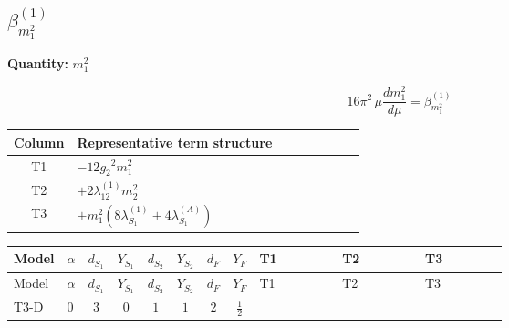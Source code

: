 \documentclass[8pt]{article}
\begin{document}
\begin{landscape}
\section*{$\beta_{m_1^2}^{(1)}$}
\noindent\textbf{Quantity: }$m_1^2$\par\smallskip
\[16\pi^2\,\mu\frac{d m_1^2}{d\mu}=\beta_{m_1^2}^{(1)}\]
\begin{center}
\begin{tabular}{@{}c >{\raggedright\arraybackslash}p{0.82\linewidth}@{}}
\toprule
Column & Representative term structure \\
\midrule
T1 & \(\displaystyle -12 {g_2}^2 {m_1^2}\) \\
\midrule
T2 & \(\displaystyle +2 {\lambda_{12}^{(1)}} {m_2^2}\) \\
\midrule
T3 & \(\displaystyle +{m_1^2} (8 {\lambda_{S_1}^{(1)}}+4 {\lambda_{S_1}^{(A)}})\) \\
\midrule
\bottomrule
\end{tabular}
\end{center}
\smallskip
\tiny
\begin{longtable}{@{}llcccccc >{\raggedright\arraybackslash}p{0.21\linewidth} >{\raggedright\arraybackslash}p{0.21\linewidth} >{\raggedright\arraybackslash}p{0.21\linewidth}@{}}
\toprule
Model & $\alpha$ & $d_{S_1}$ & $Y_{S_1}$ & $d_{S_2}$ & $Y_{S_2}$ & $d_F$ & $Y_F$ & T1 & T2 & T3 \\
\midrule
\endfirsthead
\toprule
Model & $\alpha$ & $d_{S_1}$ & $Y_{S_1}$ & $d_{S_2}$ & $Y_{S_2}$ & $d_F$ & $Y_F$ & T1 & T2 & T3 \\
\midrule
\endhead
T3-D & $0$ & $3$ & $0$ & $1$ & $1$ & $2$ & $\frac{1}{2}$ & \scriptsize\adjustbox{max width=\linewidth}{$\begin{gathered} -12 {g_2}^2 {m_1^2}\end{gathered}$} & \scriptsize\adjustbox{max width=\linewidth}{$\begin{gathered} +2 {\lambda_{12}^{(1)}} {m_2^2}\end{gathered}$} & \scriptsize\adjustbox{max width=\linewidth}{$\begin{gathered} +{m_1^2} (8 {\lambda_{S_1}^{(1)}}+4 {\lambda_{S_1}^{(A)}})\end{gathered}$} \\
\midrule
\bottomrule
\end{longtable}
\clearpage

\end{landscape}
\end{document}
